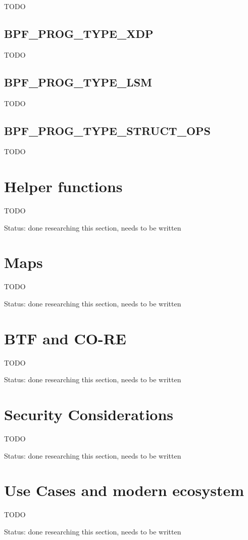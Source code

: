 TODO

\subsection*{BPF\_PROG\_TYPE\_XDP}

TODO

\subsection*{BPF\_PROG\_TYPE\_LSM}

TODO

\subsection*{BPF\_PROG\_TYPE\_STRUCT\_OPS}

TODO

\section{Helper functions}

TODO

Status: done researching this section, needs to be written

\section{Maps}

TODO

Status: done researching this section, needs to be written

\section{BTF and CO-RE}

TODO

Status: done researching this section, needs to be written

\section{Security Considerations}

TODO

Status: done researching this section, needs to be written

\section{Use Cases and modern ecosystem}

TODO

Status: done researching this section, needs to be written
